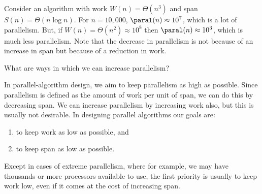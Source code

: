 \begin{cluster}
\label{grp:xmpl:analysis::models::work}

\begin{example}
\label{xmpl:analysis::models::work}
Consider an algorithm with work $W(n) = \Theta(n^3)$ and span 
$S(n) = \Theta(n \log n)$.
For $n = 10,000$, $\paral(n) \approx 10^7$, which is a lot of
parallelism.  
But, if $W(n) = \Theta(n^2) \approx 10^8$ then
$\paral(n) \approx 10^3$, which is much less parallelism. 
Note that the decrease in parallelism is not because of an increase in
span but because of a reduction in work.

\end{example}
\end{cluster}

\begin{cluster}
\label{grp:tch:analysis::models::ways}

\begin{teachask}
\label{tch:analysis::models::ways}
What are ways in which we can increase parallelism?

\end{teachask}
\end{cluster}

\begin{cluster}
\label{grp:grm:analysis::models::designing-parallel-algorithms}

\begin{gram}
\label{grm:analysis::models::designing-parallel-algorithms}
In parallel-algorithm design, we aim to keep parallelism as high
as possible.
Since parallelism is defined as the amount of work per unit of span, 
we can do this by decreasing span.
We can increase parallelism by increasing work also, but this is
usually not desirable.
In designing parallel algorithms our goals are: 

\begin{enumerate}
\item   to keep work as low as possible, and
\item   to keep span as low as possible.
\end{enumerate}

Except in cases of extreme parallelism, where for example, we may have
thousands or more processors available to use, the first priority is
usually to keep work low, even if it comes at the cost of increasing
span.

\end{gram}
\end{cluster}

